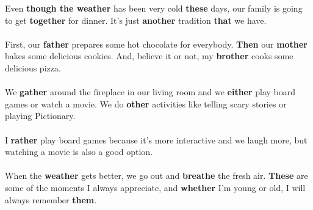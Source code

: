 Even \textbf{though the weather} has been very cold \textbf{these} days,
our family is going to get \textbf{together} for dinner. It's just 
\textbf{another} tradition \textbf{that} we have.
\\\\
First, our \textbf{father} prepares some hot chocolate for 
everybody. \textbf{Then} our \textbf{mother} bakes some delicious
cookies. And, believe it or not, my \textbf{brother} cooks some
delicious pizza.
\\\\
We \textbf{gather} around the fireplace in our living room and we 
\textbf{either} play board games or watch a movie. We do \textbf{other}
activities like telling scary stories or playing Pictionary.
\\\\
I \textbf{rather} play board games because it's more interactive 
and we laugh more, but watching a movie is also a good 
option.
\\\\
When the \textbf{weather} gets better, we go out and \textbf{breathe} the
fresh air. \textbf{These} are some of the moments I always
appreciate, and \textbf{whether} I'm young or old, I will always 
remember \textbf{them}.











\newpage







